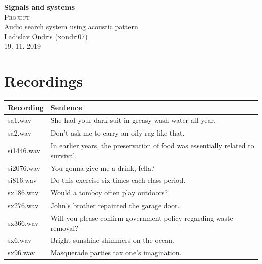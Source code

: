 \documentclass[11pt]{article}
\begin{document}
\begin{titlepage}
\center


\textbf{\Huge{Signals and systems}}
\\[4.0cm]

\textsc{\Huge {Project}}
\\[0.2cm]

\Large {Audio search system using acoustic pattern}
\\[3.0cm]

\Large{Ladislav Ondris (xondri07)}
\\[0.7cm]
\Large{19. 11. 2019}

\end{titlepage}

\newpage

\section{Recordings}
\par

\begin{center}
\begin{tabular}{ |l|l| } 
\hline
Recording & Sentence \\
\hline
sa1.wav & She had your dark suit in greasy wash water all year.  \\ 
sa2.wav & Don't ask me to carry an oily rag like that. \\ 
si1446.wav & In earlier years, the preservation of food was essentially related to survival. \\ 
si2076.wav & You gonna give me a drink, fella? \\ 
si816.wav & Do this exercise six times each class period. \\ 
sx186.wav & Would a tomboy often play outdoors? \\ 
sx276.wav & John's brother repainted the garage door. \\ 
sx366.wav & Will you please confirm government policy regarding waste removal? \\ 
sx6.wav & Bright sunshine shimmers on the ocean. \\ 
sx96.wav & Masquerade parties tax one's imagination. \\ 
\hline
\end{tabular}
\end{center}
\end{document}
